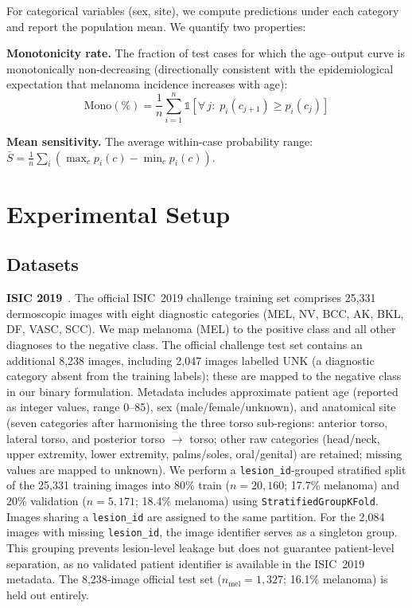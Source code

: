 \documentclass[12pt, a4paper]{article}
\begin{document}
For categorical variables (sex, site), we compute predictions under each category and report the population mean. We quantify two properties:

\textbf{Monotonicity rate.} The fraction of test cases for which the age--output curve is monotonically non-decreasing (directionally consistent with the epidemiological expectation that melanoma incidence increases with age):
\begin{equation}
    \text{Mono}(\%) = \frac{1}{n} \sum_{i=1}^n \mathbb{1}\!\left[\forall\, j:\; p_i(c_{j+1}) \geq p_i(c_j)\right]
\end{equation}

\textbf{Mean sensitivity.} The average within-case probability range: $\bar{S} = \frac{1}{n}\sum_i (\max_c p_i(c) - \min_c p_i(c))$.

\section{Experimental Setup}
\label{sec:experiments}

\subsection{Datasets}

\textbf{ISIC 2019}~\citep{tschandl2018ham10000, combalia2019bcn20000, codella2018skin}. The official ISIC~2019 challenge training set comprises 25{,}331 dermoscopic images with eight diagnostic categories (MEL, NV, BCC, AK, BKL, DF, VASC, SCC). We map melanoma (MEL) to the positive class and all other diagnoses to the negative class. The official challenge test set contains an additional 8{,}238 images, including 2{,}047 images labelled UNK (a diagnostic category absent from the training labels); these are mapped to the negative class in our binary formulation. Metadata includes approximate patient age (reported as integer values, range 0--85), sex (male/female/unknown), and anatomical site (seven categories after harmonising the three torso sub-regions: anterior torso, lateral torso, and posterior torso $\to$ torso; other raw categories (head/neck, upper extremity, lower extremity, palms/soles, oral/genital) are retained; missing values are mapped to unknown). We perform a \texttt{lesion\_id}-grouped stratified split of the 25{,}331 training images into 80\% train ($n{=}20{,}160$; 17.7\% melanoma) and 20\% validation ($n{=}5{,}171$; 18.4\% melanoma) using \texttt{StratifiedGroupKFold}. Images sharing a \texttt{lesion\_id} are assigned to the same partition. For the 2{,}084 images with missing \texttt{lesion\_id}, the image identifier serves as a singleton group. This grouping prevents lesion-level leakage but does not guarantee patient-level separation, as no validated patient identifier is available in the ISIC~2019 metadata. The 8{,}238-image official test set ($n_{\text{mel}} = 1{,}327$; 16.1\% melanoma) is held out entirely.
\end{document}
